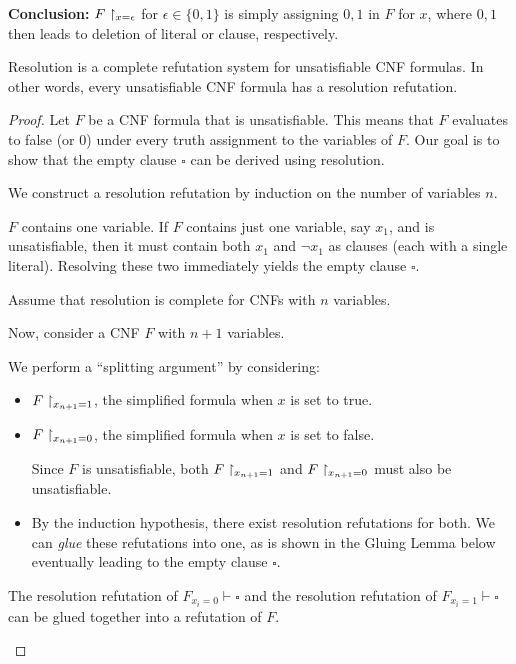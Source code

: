 \textbf{Conclusion:}  
$F\upharpoonright_{x = \epsilon}$ for $\epsilon \in \{0,1\}$ is simply assigning $0,1$ in $F$ for $x$, where $0,1$ then leads to deletion of literal or clause, respectively.




\begin{theorem}
Resolution is a complete refutation system for unsatisfiable CNF formulas. In other words, every unsatisfiable CNF formula has a resolution refutation. 
\end{theorem}

\begin{proof}
Let $F$ be a CNF formula that is unsatisfiable. This means that $F$ evaluates to false (or 0) under every truth assignment to the variables of $F$. Our goal is to show that the empty clause $\square$ can be derived using resolution.

We construct a resolution refutation by induction on the number of variables $n$.

\Base $F$ contains one variable. 
If $F$ contains just one variable, say $x_1$, and is unsatisfiable, then it must contain both $x_1$ and $\neg x_1$ as clauses (each with a single literal).
Resolving these two immediately yields the empty clause $\square$.

\induction  Assume that resolution is complete for CNFs with $n$ variables.
    \item Now, consider a CNF $F$ with $n+1$ variables.
    \item We perform a ``splitting argument'' by considering:
    \begin{itemize}
        \item $F\upharpoonright_{x_{n+1}=1}$, the simplified formula when $x$ is set to true.
        \item $F\upharpoonright_{x_{n+1}=0}$, the simplified formula when $x$ is set to false. 

Since $F$ is unsatisfiable, both $F\upharpoonright_{x_{n+1}=1}$ and $F\upharpoonright_{x_{n+1}=0}$ must also be unsatisfiable.
        \item By the induction hypothesis, there exist resolution refutations for both. We can \emph{glue} these refutations into one, as is shown in the Gluing Lemma below eventually leading to the empty clause $\square$.
    \end{itemize}
 
  
 
 

\begin{lemma}
\label{lem:glueing-no-width}
The resolution refutation of $F_{x_i = 0} \vdash \square$ and the resolution refutation of $F_{x_i = 1} \vdash \square$ can be glued together into a refutation of $F$.


\end{lemma}
\end{proof}
